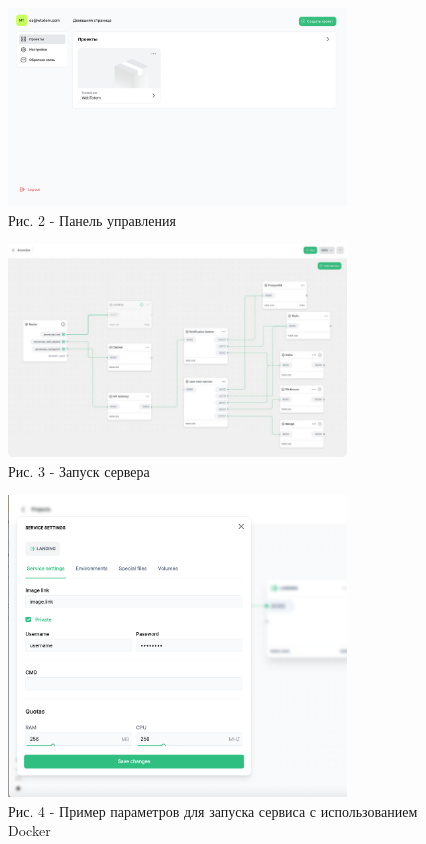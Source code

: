 \begin{figure}[H]
	\centering
	\includegraphics[width=0.8\textwidth]{media/ict/image19}
	\caption*{Рис. 2 - Панель управления}
\end{figure}

\begin{figure}[H]
	\centering
	\includegraphics[width=0.8\textwidth]{media/ict/image20}
	\caption*{Рис. 3 - Запуск сервера}
\end{figure}

\begin{figure}[H]
	\centering
	\includegraphics[width=0.8\textwidth]{media/ict/image21}
	\caption*{Рис. 4 - Пример параметров для запуска сервиса с использованием Docker}
\end{figure}

